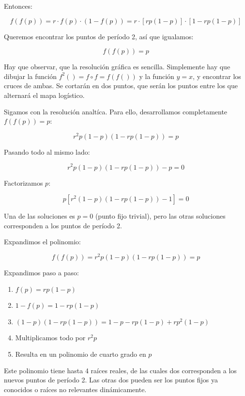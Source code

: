 \documentclass[
  11pt,
  a4paper,
  DIV=11,
  numbers=noendperiod]{scrreprt}
\providecommand{\tightlist}{%
  \setlength{\itemsep}{0pt}\setlength{\parskip}{0pt}}
\begin{document}
Entonces:

\[
f(f(p)) = r \cdot f(p) \cdot (1 - f(p)) = r \cdot [r p (1 - p)] \cdot \left[1 - r p (1 - p)\right]
\]

Queremos encontrar los puntos de período 2, así que igualamos:

\[
f(f(p)) = p
\]

Hay que observar, que la resolución gráfica es sencilla. Simplemente hay
que dibujar la función \(f^2()=f \circ f = f(f())\) y la función
\(y=x\), y encontrar los cruces de ambas. Se cortarán en dos puntos, que
serán los puntos entre los que alternará el mapa logístico.

Sigamos con la resolución analtíca. Para ello, desarrollamos
completamente \(f(f(p)) = p\):

\[
r^2 p (1 - p)(1 - r p (1 - p)) = p
\]

Pasando todo al mismo lado:

\[
r^2 p (1 - p)(1 - r p (1 - p)) - p = 0
\]

Factorizamos \(p\):

\[
p \left[ r^2 (1 - p)(1 - r p (1 - p)) - 1 \right] = 0
\]

Una de las soluciones es \(p = 0\) (punto fijo trivial), pero las otras
soluciones corresponden a los puntos de período 2.

Expandimos el polinomio:

\[
f(f(p)) = r^2 p (1 - p)(1 - r p (1 - p)) = p
\]

Expandimos paso a paso:

\begin{enumerate}
\def\labelenumi{\arabic{enumi}.}
\tightlist
\item
  \(f(p) = r p (1 - p)\)\\
\item
  \(1 - f(p) = 1 - r p (1 - p)\)\\
\item
  \((1 - p)(1 - r p (1 - p)) = 1 - p - r p (1 - p) + r p^2 (1 - p)\)\\
\item
  Multiplicamos todo por \(r^2 p\)\\
\item
  Resulta en un polinomio de cuarto grado en \(p\)
\end{enumerate}

Este polinomio tiene hasta 4 raíces reales, de las cuales dos
corresponden a los nuevos puntos de período 2. Las otras dos pueden ser
los puntos fijos ya conocidos o raíces no relevantes dinámicamente.
\end{document}
